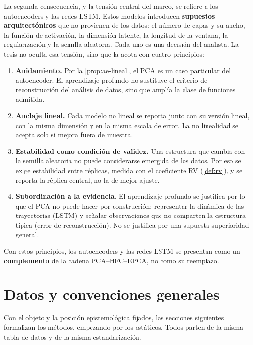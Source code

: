 La segunda consecuencia, y la tensión central del marco, se refiere a los autoencoders y las
redes LSTM. Estos modelos introducen \textbf{supuestos arquitectónicos} que no provienen de los
datos: el número de capas y su ancho, la función de activación, la dimensión latente, la longitud
de la ventana, la regularización y la semilla aleatoria. Cada uno es una decisión del analista.
La tesis no oculta esa tensión, sino que la acota con cuatro principios:

\begin{enumerate}[leftmargin=*]
  \item \textbf{Anidamiento.} Por la \cref{prop:ae-lineal}, el PCA es un caso particular del
    autoencoder. El aprendizaje profundo no sustituye el criterio de reconstrucción del análisis
    de datos, sino que amplía la clase de funciones admitida.
  \item \textbf{Anclaje lineal.} Cada modelo no lineal se reporta junto con su versión lineal,
    con la misma dimensión y en la misma escala de error. La no linealidad se acepta solo si
    mejora fuera de muestra.
  \item \textbf{Estabilidad como condición de validez.} Una estructura que cambia con la semilla
    aleatoria no puede considerarse emergida de los datos. Por eso se exige estabilidad entre
    réplicas, medida con el coeficiente RV (\cref{def:rv}), y se reporta la réplica central, no
    la de mejor ajuste.
  \item \textbf{Subordinación a la evidencia.} El aprendizaje profundo se justifica por lo que el
    PCA no puede hacer por construcción: representar la dinámica de las trayectorias (LSTM) y
    señalar observaciones que no comparten la estructura típica (error de reconstrucción). No se
    justifica por una supuesta superioridad general.
\end{enumerate}

Con estos principios, los autoencoders y las redes LSTM se presentan como un
\textbf{complemento} de la cadena PCA--HFC--EPCA, no como su reemplazo.

\section{Datos y convenciones generales}
\label{sec:datos}

Con el objeto y la posición epistemológica fijados, las secciones siguientes formalizan los
métodos, empezando por los estáticos. Todos parten de la misma tabla de datos y de la misma
estandarización.

